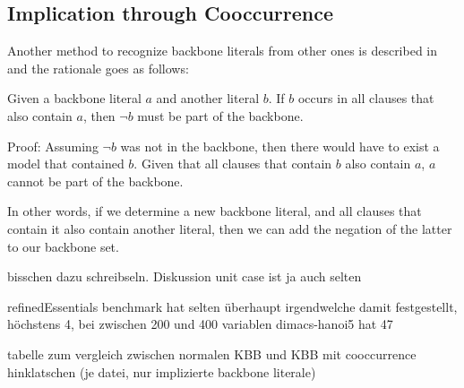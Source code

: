 \subsection{Implication through Cooccurrence}
\label{subsec:coocc}

Another method to recognize backbone literals from other ones is described in \cite{wbxcl16} and the rationale goes as follows:
\begin{lemma}
Given a backbone literal $a$ and another literal $b$. If $b$ occurs in all clauses that also contain $a$, then $\neg b$ must be part of the backbone. 

Proof: Assuming $\neg b$ was not in the backbone, then there would have to exist a model that contained $b$. Given that all clauses that contain $b$ also contain $a$, $a$ cannot be part of the backbone.
\end{lemma}

In other words, if we determine a new backbone literal, and all clauses that contain it also contain another literal, then we can add the negation of the latter to our backbone set. 

bisschen dazu schreibseln. Diskussion unit case ist ja auch selten

refinedEssentials benchmark hat selten überhaupt irgendwelche damit festgestellt, höchstens 4, bei zwischen 200 und 400 variablen
dimacs-hanoi5 hat 47

tabelle zum vergleich zwischen normalen KBB und KBB mit cooccurrence hinklatschen (je datei, nur implizierte backbone literale)

